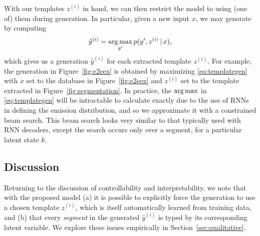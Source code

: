 \documentclass[11pt,a4paper]{article}
\begin{document}
With our templates $z^{(i)}$ in hand, we can then restrict the model to using (one of) them during generation. In particular, given a new input $x$, we may generate by computing
\begin{align} \label{eq:templategen}
    \hat{y}^{(i)} = \argmax_{y'} p(y', z^{(i)} \given x),
\end{align}
which gives us a generation $\hat{y}^{(i)}$ for each extracted template $z^{(i)}$. For example, the generation in Figure~\ref{fig:e2eex} is obtained by maximizing \eqref{eq:templategen} with $x$ set to the database in Figure~\ref{fig:e2eex} and $z^{(i)}$ set to the template extracted in Figure~\ref{fig:segmentation}. 
In practice, the $\argmax$ in \eqref{eq:templategen} will be intractable to calculate exactly due to the use of RNNs in defining the emission distribution, and so we approximate it with a constrained beam search. This beam search looks very similar to that typically used with RNN decoders, except the search occurs only over a segment, for a particular latent state $k$. 


\subsection{Discussion}
Returning to the discussion of controllability and interpretability, we note that 
with the proposed model (a) it is possible to explicitly force the generation to use a chosen template $z^{(i)}$, which is itself automatically learned from training data, and (b) that every \textit{segment} in the generated $\hat{y}^{(i)}$ is typed by its corresponding latent variable. We explore these issues 
empirically in Section~\ref{sec:qualitative}. 


\end{document}
